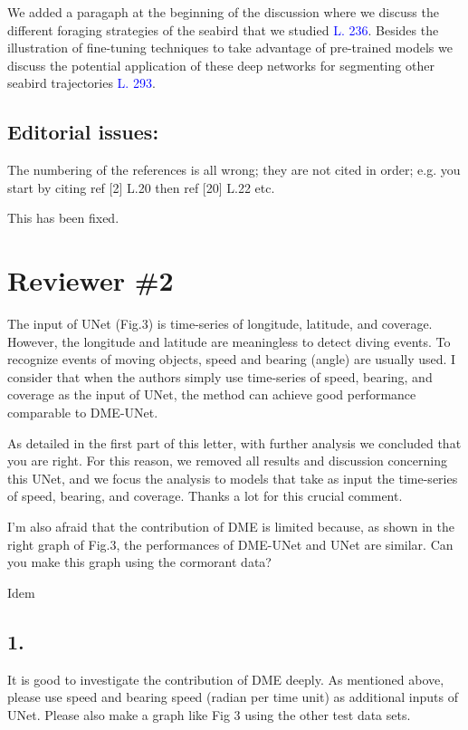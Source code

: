 \documentclass{ar2rc}
\begin{document}
\AR We added a paragaph at the beginning of the discussion where we discuss the different foraging strategies of the seabird that we studied \textcolor{blue}{L. 236}. Besides the illustration of fine-tuning techniques to take advantage of pre-trained models we discuss the potential application of these deep networks for segmenting other seabird trajectories \textcolor{blue}{L. 293}.

\subsection*{Editorial issues:}

\RC The numbering of the references is all wrong; they are not cited in order; e.g. you start by citing ref [2] L.20 then ref [20] L.22 etc.

\AR This has been fixed.

\section*{Reviewer \#2}


\RC The input of UNet (Fig.3) is time-series of longitude, latitude, and coverage. However, the longitude and latitude are meaningless to detect diving events. To recognize events of moving objects, speed and bearing (angle) are usually used. I consider that when the authors simply use time-series of speed, bearing, and coverage as the input of UNet, the method can achieve good performance comparable to DME-UNet.

\AR As detailed in the first part of this letter, with further analysis we concluded that you are right. For this reason, we removed all results and discussion concerning this UNet, and we focus the analysis to models that take as input the time-series of speed, bearing, and coverage. Thanks a lot for this crucial comment.

\RC I'm also afraid that the contribution of DME is limited because, as shown in the right graph of Fig.3, the performances of DME-UNet and UNet are similar. Can you make this graph using the cormorant data?

\AR Idem

\subsection*{1.}

\RC  It is good to investigate the contribution of DME deeply. As mentioned above, please use speed and bearing speed (radian per time unit) as additional inputs of UNet. Please also make a graph like Fig 3 using the other test data sets.
\end{document}
